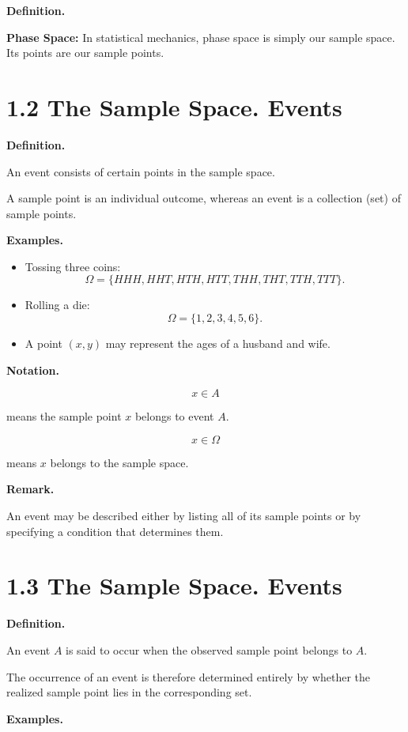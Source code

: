 \documentclass[12pt]{article}
\begin{document}
\textbf{Definition.}

\textbf{Phase Space:} In statistical mechanics, phase space is simply our sample space. Its points are our sample points.

\section*{1.2 The Sample Space. Events}

\textbf{Definition.}

An event consists of certain points in the sample space.

A sample point is an individual outcome, whereas an event is a collection (set) of sample points.

\textbf{Examples.}

\begin{itemize}
    \item Tossing three coins:
    \[
    \Omega=\{HHH,HHT,HTH,HTT,THH,THT,TTH,TTT\}.
    \]

    \item Rolling a die:
    \[
    \Omega=\{1,2,3,4,5,6\}.
    \]

    \item A point \((x,y)\) may represent the ages of a husband and wife.
\end{itemize}

\textbf{Notation.}

\[
x\in A
\]

means the sample point \(x\) belongs to event \(A\).

\[
x\in\Omega
\]

means \(x\) belongs to the sample space.

\textbf{Remark.}

An event may be described either by listing all of its sample points or by specifying a condition that determines them.

\section*{1.3 The Sample Space. Events}

\textbf{Definition.}

An event \(A\) is said to occur when the observed sample point belongs to \(A\).

The occurrence of an event is therefore determined entirely by whether the realized sample point lies in the corresponding set.

\textbf{Examples.}
\end{document}
